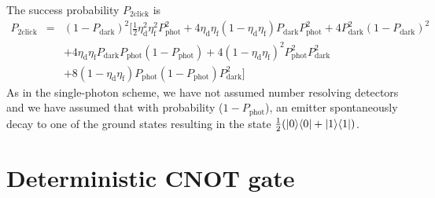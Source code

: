 The success probability $P_{\text{2click}}$ is 
\begin{eqnarray}
P_{\text{2click}}&=&(1-P_{\text{dark}})^{2}\Big[\frac{1}{2}
\eta_{\text{d}}^{2}\eta_{\text{f}}^{2}P_{\text{phot}}^{2} 
 +4\eta_{\text{d}}\eta_{\text{f}}(1-\eta_{\text{d}}\eta_{\text{f}})
P_{\text{dark}}P_{\text{phot}}^{2}
+4P_{\text{dark}}^{2}(1-P_{\text{dark}})^{2} \nonumber \\
&&+4\eta_{\text{d}}\eta_{\text{f}}P_{\text{dark}}P_{\text{phot}}
(1-P_{\text{phot}})+4(1-\eta_{\text{d}}\eta_{\text{f}})^{2}P_{\text{phot}}^{2}
P_{\text{dark}}^{2} 
\nonumber \\
&&+8(1-\eta_{\text{d}}\eta_{\text{f}})P_{\text{phot}}
(1-P_{\text{phot}})P_{\text{dark}}^{2}\Big]
\end{eqnarray}
As in the single-photon scheme, we have not assumed number resolving detectors
and we have assumed that with probability ($1-P_{\text{phot}}$), an emitter
spontaneously decay to one of the ground states resulting in the state
$\frac{1}{2}(| 0 \rangle\langle 0 |+| 1 \rangle\langle 1 |)$.

\section{Deterministic CNOT gate} \label{app:cnot}


